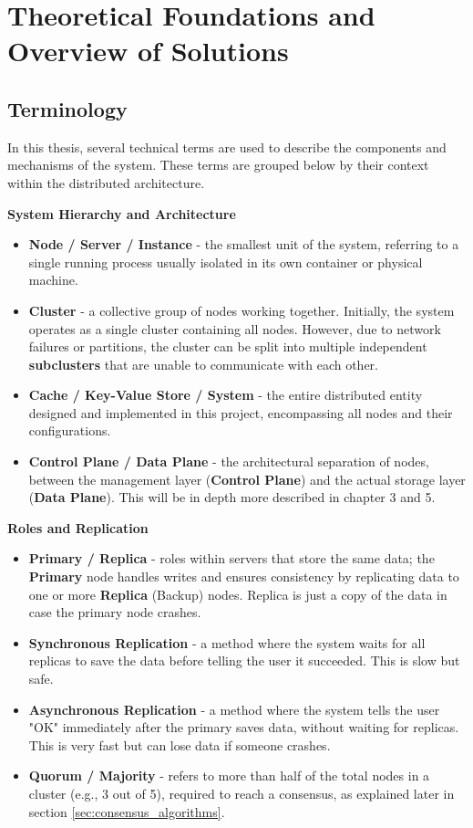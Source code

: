 \documentclass[shortabstract]{iithesis}
\begin{document}

\chapter{Theoretical Foundations and Overview of Solutions}

\section{Terminology}
In this thesis, several technical terms are used to describe the components and mechanisms of the system. These terms are grouped below by their context within the distributed architecture.

\textbf{System Hierarchy and Architecture}
\begin{itemize}
    \item \textbf{Node / Server / Instance} - the smallest unit of the system, referring to a single running process usually isolated in its own container or physical machine.
    \item \textbf{Cluster} - a collective group of nodes working together. Initially, the system operates as a single cluster containing all nodes. However, due to network failures or partitions, the cluster can be split into multiple independent \textbf{subclusters} that are unable to communicate with each other.
    \item \textbf{Cache / Key-Value Store / System} - the entire distributed entity designed and implemented in this project, encompassing all nodes and their configurations.
    \item \textbf{Control Plane / Data Plane} - the architectural separation of nodes, between the management layer (\textbf{Control Plane}) and the actual storage layer (\textbf{Data Plane}). This will be in depth more described in chapter 3 and 5.
\end{itemize}

\textbf{Roles and Replication}
\begin{itemize}
    \item \textbf{Primary / Replica} - roles within servers that store the same data; the \textbf{Primary} node handles writes and ensures consistency by replicating data to one or more \textbf{Replica} (Backup) nodes. Replica is just a copy of the data in case the primary node crashes.
    \item \textbf{Synchronous Replication} - a method where the system waits for all replicas to save the data before telling the user it succeeded. This is slow but safe.
    \item \textbf{Asynchronous Replication} - a method where the system tells the user "OK" immediately after the primary saves data, without waiting for replicas. This is very fast but can lose data if someone crashes.
    \item \textbf{Quorum / Majority} \label{def:quorum} - refers to more than half of the total nodes in a cluster (e.g., 3 out of 5), required to reach a consensus, as explained later in section \ref{sec:consensus_algorithms}.
\end{itemize}
\end{document}
